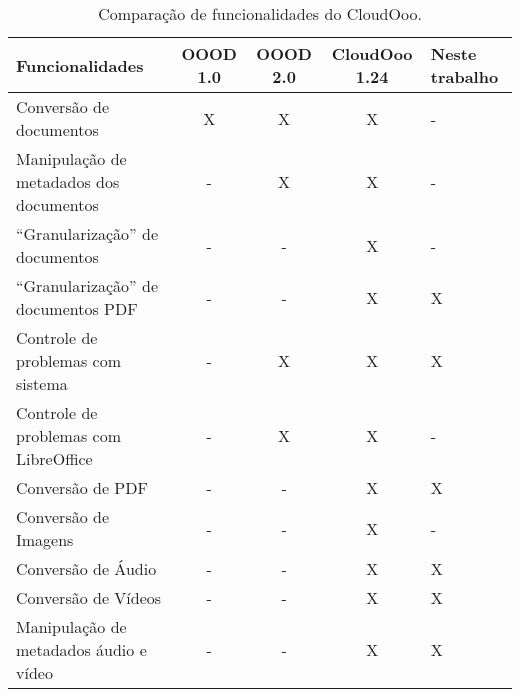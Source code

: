 \begin{table}
  \caption{Comparação de funcionalidades do CloudOoo.}
  \label{funclooo}
  \begin{tabular}[b]{|p{3.5cm}|c|c|c|p{1.5cm}|}
  \hline
  Funcionalidades & OOOD 1.0 & OOOD 2.0 & CloudOoo 1.24 & Neste trabalho \\
  \hline
  Conversão de documentos & X & X & X & - \\
  \hline
  Manipulação de metadados dos documentos & - & X & X & - \\
  \hline
  ``Granularização'' de documentos & - & - & X & - \\
  \hline
  ``Granularização'' de documentos PDF & - & - & X & X \\
  \hline
  Controle de problemas com sistema & - & X & X & X \\
  \hline
  Controle de problemas com LibreOffice & - & X & X & - \\
  \hline
  Conversão de PDF & - & - & X & X \\
  \hline
  Conversão de Imagens & - & - & X & - \\
  \hline
  Conversão de Áudio & - & - & X & X \\
  \hline
  Conversão de Vídeos & - & - & X & X \\
  \hline
  Manipulação de metadados áudio e vídeo & - & - & X & X \\
  \hline
  \end{tabular}
\end{table}


